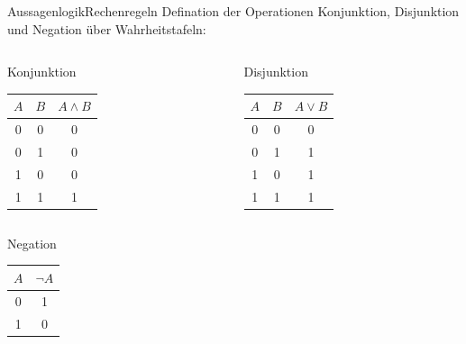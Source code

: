 \documentclass[xelatex,aspectratio=169]{beamer}
\begin{document}
\begin{frame}{Aussagenlogik}{Rechenregeln}
  Defination der Operationen Konjunktion, Disjunktion und Negation über Wahrheitstafeln:
  \begin{columns}[onlytextwidth]
    \begin{column}{0.48\textwidth}
      \begin{block}{Konjunktion}
        \centering\small
        \begin{tabular}{ccc}
          \toprule
          $A$ & $B$ & $A \land B$ \\
          \midrule
          0   & 0   & 0           \\
          0   & 1   & 0           \\
          1   & 0   & 0           \\
          1   & 1   & 1           \\
          \bottomrule
        \end{tabular}
      \end{block}
    \end{column}
    \begin{column}{0.48\textwidth}
      \begin{block}{Disjunktion}
        \centering\small
        \begin{tabular}{ccc}
          \toprule
          $A$ & $B$ & $A \lor B $ \\
          \midrule
          0   & 0   & 0           \\
          0   & 1   & 1           \\
          1   & 0   & 1           \\
          1   & 1   & 1           \\
          \bottomrule
        \end{tabular}
      \end{block}
    \end{column}
  \end{columns}
  \begin{block}{Negation}
    \centering\small
    \begin{tabular}{cc}
      \toprule
      $A$ & $\lnot A$ \\
      \midrule
      0   & 1         \\
      1   & 0         \\
      \bottomrule
    \end{tabular}
  \end{block}
\end{frame}
\end{document}
